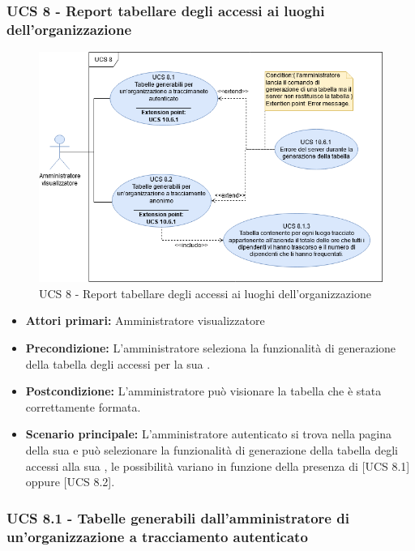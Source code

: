 \subsubsection{UCS 8 - Report tabellare degli accessi ai luoghi dell'organizzazione}%
\begin{figure}[h!]
	\centering
    \includegraphics[scale=0.53]{Sezioni/UseCase/Immagini/UCS8.png}
    \caption{UCS 8 - Report tabellare degli accessi ai luoghi dell'organizzazione}
\end{figure}

\begin{itemize}
\item \textbf{Attori primari:} Amministratore visualizzatore
\item \textbf{Precondizione:} L'amministratore seleziona la funzionalità di generazione della tabella degli accessi per la sua .
\item \textbf{Postcondizione:} L'amministratore può visionare la tabella che è stata correttamente formata.
\item \textbf{Scenario principale:} L'amministratore autenticato si trova nella pagina della sua  e può selezionare la funzionalità di generazione della tabella degli accessi alla sua , le possibilità variano in funzione della presenza di  [UCS 8.1] oppure  [UCS 8.2].
\end{itemize}

\subsubsection{UCS 8.1 - Tabelle generabili dall'amministratore di un'organizzazione a tracciamento autenticato}%

